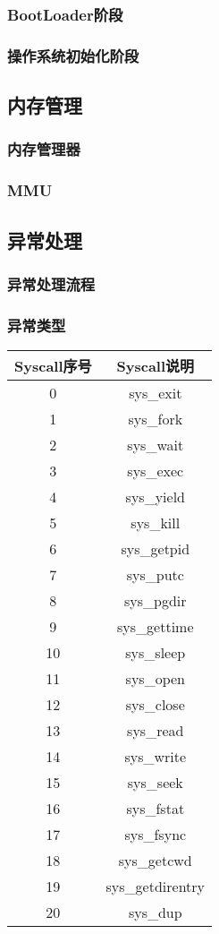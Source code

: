 \documentclass[11pt,utf8]{article}
\begin{document}
\subsubsection{BootLoader阶段}
\subsubsection{操作系统初始化阶段}

\subsection{内存管理}
\subsubsection{内存管理器}
\subsubsection{MMU}
\subsection{异常处理}
\subsubsection{异常处理流程}
\subsubsection{异常类型}
\begin{center}
\begin{tabular}{|c|c|}
\hline
\textbf{Syscall序号} & \textbf{Syscall说明} \\
\hline
0 & sys\_exit \\
1 & sys\_fork \\
2 & sys\_wait \\
3 & sys\_exec \\
4 & sys\_yield \\
5 & sys\_kill \\
6 & sys\_getpid \\
7 & sys\_putc \\
8 & sys\_pgdir \\
9 & sys\_gettime \\
10 & sys\_sleep \\
11 & sys\_open \\
12 & sys\_close \\
13 & sys\_read \\
14 & sys\_write \\
15 & sys\_seek \\
16 & sys\_fstat \\
17 & sys\_fsync \\
18 & sys\_getcwd \\
19 & sys\_getdirentry \\
20 & sys\_dup \\
\hline
\end{tabular}
\end{center}
\end{document}
